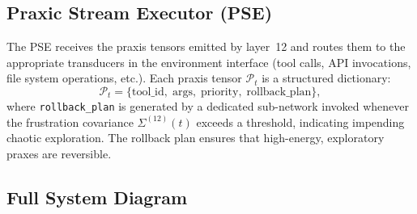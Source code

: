 \documentclass[12pt,a4paper]{article}
\begin{document}
\subsection{Praxic Stream Executor (PSE)}

The PSE receives the praxis tensors emitted by layer~12 and routes them to the
appropriate transducers in the environment interface (tool calls, API
invocations, file system operations, etc.). Each praxis tensor $\mathcal{P}_t$
is a structured dictionary:
\[
  \mathcal{P}_t = \bigl\{\text{tool\_id},\; \text{args},\;
  \text{priority},\; \text{rollback\_plan}\bigr\},
\]
where \texttt{rollback\_plan} is generated by a dedicated sub-network invoked
whenever the frustration covariance $\Sigma^{(12)}(t)$ exceeds a threshold,
indicating impending chaotic exploration. The rollback plan ensures that
high-energy, exploratory praxes are reversible.

\subsection{Full System Diagram}
\end{document}

